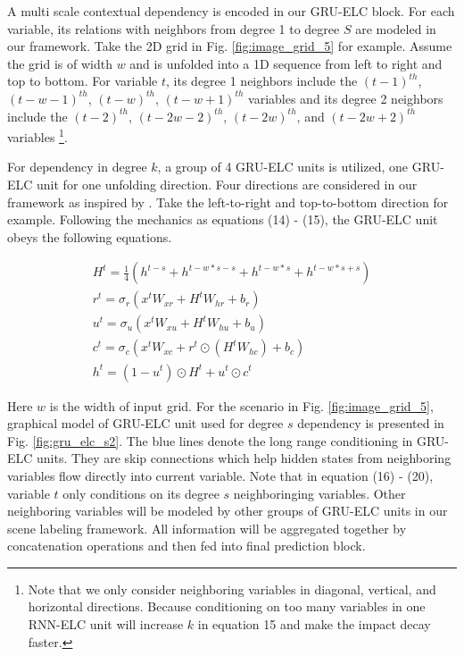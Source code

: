 \documentclass[10pt,twocolumn,letterpaper]{article}
\begin{document}
A multi scale contextual dependency is encoded in our GRU-ELC block. For each variable, its relations with neighbors from degree 1 to degree $S$ are modeled in our framework. Take the 2D grid in Fig. \ref{fig:image_grid_5} for example. Assume the grid is of width $w$ and is unfolded into a 1D sequence from left to right and top to bottom. For variable $t$, its degree 1 neighbors include the $(t-1)^{th}$, $(t-w-1)^{th}$, $(t-w)^{th}$, $(t-w+1)^{th}$ variables and its degree 2 neighbors include the $(t-2)^{th}$, $(t-2w-2)^{th}$, $(t-2w)^{th}$, and $(t-2w+2)^{th}$ variables \footnote{Note that we only consider neighboring variables in diagonal, vertical, and horizontal directions. Because conditioning on too many variables in one RNN-ELC unit will increase $k$ in equation 15 and make the impact decay faster.}.

For dependency in degree $k$, a group of 4 GRU-ELC units is utilized, one GRU-ELC unit for one unfolding direction. Four directions are considered in our framework as inspired by \cite{10, 13, 14}. Take the left-to-right and top-to-bottom direction for example. Following the mechanics as equations (14) - (15), the GRU-ELC unit obeys the following equations.

\begin{gather}
H^t  =   \frac{1}{4}  (h^{t-s} + h^{t- w*s - s} + h^{t - w*s} + h^{t-w*s+s} )  \\
   r^t = \sigma_r (  x^t W_{xr} + H^t W_{hr} + b_r       )    \\
   u^t = \sigma_u (  x^t W_{xu} + H^t W_{hu} + b_u       )    \\   
   c^t = \sigma_c (  x^t W_{xc} +  r^t \odot (  H^t W_{hc} ) + b_c       )    \\
   h^t = (1-u^t) \odot H^t + u^t \odot c^t
\end{gather}

Here $w$ is the width of input grid. For the scenario in Fig. \ref{fig:image_grid_5}, graphical model of GRU-ELC unit used for degree $s$ dependency is presented in Fig. \ref{fig:gru_elc_s2}. The blue lines denote the long range conditioning in GRU-ELC units. They are skip connections which help hidden states from neighboring variables flow directly into current variable. Note that in equation (16) - (20), variable $t$ only conditions on its degree $s$ neighboringing variables. Other neighboring variables will be modeled by other groups of GRU-ELC units in our scene labeling framework. All information will be aggregated together by concatenation operations and then fed into final prediction block.
\end{document}

